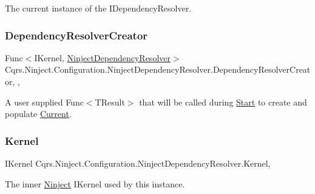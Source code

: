 The current instance of the I\+Dependency\+Resolver. 

\mbox{\label{classCqrs_1_1Ninject_1_1Configuration_1_1NinjectDependencyResolver_a11ea52beeb7420d21c99baeb3501aa0a}} 
\subsubsection{\texorpdfstring{Dependency\+Resolver\+Creator}{DependencyResolverCreator}}
{\footnotesize\ttfamily Func$<$I\+Kernel, \hyperlink{classCqrs_1_1Ninject_1_1Configuration_1_1NinjectDependencyResolver}{Ninject\+Dependency\+Resolver}$>$ Cqrs.\+Ninject.\+Configuration.\+Ninject\+Dependency\+Resolver.\+Dependency\+Resolver\+Creator\hspace{0.3cm}{\ttfamily [static]}, {\ttfamily [get]}, {\ttfamily [set]}}



A user supplied Func$<$\+T\+Result$>$ that will be called during \hyperlink{classCqrs_1_1Ninject_1_1Configuration_1_1NinjectDependencyResolver_adc6171ed45679dcbaa67782770ba5083}{Start} to create and populate \hyperlink{classCqrs_1_1Ninject_1_1Configuration_1_1NinjectDependencyResolver_a2a8ebdf55ecac9eccccc237d422a3f31}{Current}. 

\mbox{\label{classCqrs_1_1Ninject_1_1Configuration_1_1NinjectDependencyResolver_a507ba37916f7e77cd5bbcc14543c03b5}} 
\subsubsection{\texorpdfstring{Kernel}{Kernel}}
{\footnotesize\ttfamily I\+Kernel Cqrs.\+Ninject.\+Configuration.\+Ninject\+Dependency\+Resolver.\+Kernel\hspace{0.3cm}{\ttfamily [get]}, {\ttfamily [protected]}}



The inner \hyperlink{namespaceCqrs_1_1Ninject}{Ninject} I\+Kernel used by this instance. 

